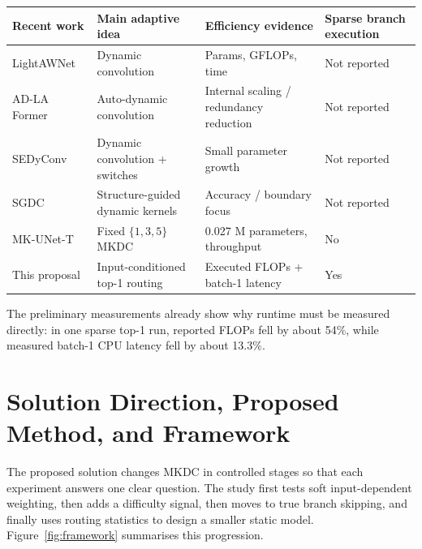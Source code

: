\documentclass[10pt,a4paper]{article}
\begin{document}
\begin{center}\small
\renewcommand{\arraystretch}{1.08}
\begin{tabularx}{\linewidth}{@{}p{2.55cm}p{3.0cm}p{3.0cm}X@{}}
\toprule
Recent work & Main adaptive idea & Efficiency evidence & Sparse branch execution \\
\midrule
LightAWNet~\cite{wang2025lightawnet} & Dynamic convolution & Params, GFLOPs, time & Not reported \\
AD-LA Former~\cite{wang2025adlaformer} & Auto-dynamic convolution & Internal scaling / redundancy reduction & Not reported \\
SEDyConv~\cite{hao2025sedyconv} & Dynamic convolution + switches & Small parameter growth & Not reported \\
SGDC~\cite{shi2026sgdc} & Structure-guided dynamic kernels & Accuracy / boundary focus & Not reported \\
MK-UNet-T~\cite{rahman2025mkunet} & Fixed $\{1,3,5\}$ MKDC & 0.027 M parameters, throughput & No \\
This proposal & Input-conditioned top-1 routing & Executed FLOPs + batch-1 latency & Yes \\
\bottomrule
\end{tabularx}
\end{center}

The preliminary measurements already show why runtime must be measured directly: in one sparse top-1 run, reported FLOPs fell by about 54\%, while measured batch-1 CPU latency fell by about 13.3\%.

\section{Solution Direction, Proposed Method, and Framework}

The proposed solution changes MKDC in controlled stages so that each experiment answers one clear question. The study first tests soft input-dependent weighting, then adds a difficulty signal, then moves to true branch skipping, and finally uses routing statistics to design a smaller static model. Figure~\ref{fig:framework} summarises this progression.
\end{document}
